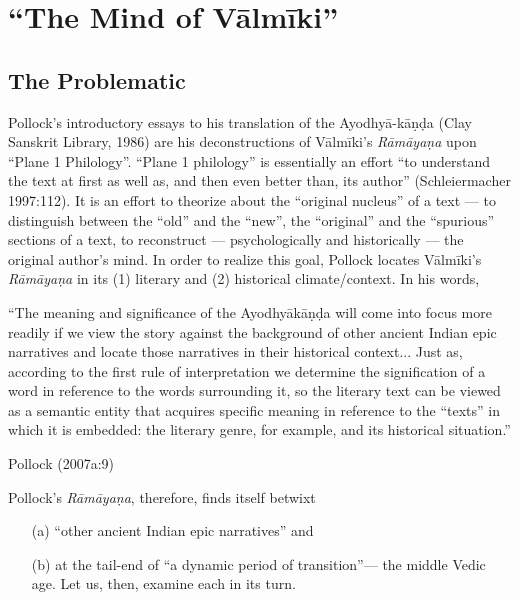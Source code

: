 \chapter{“The Mind of Vālmīki”}\label{chapter1}


\section{The Problematic}\label{sec1.1}

Pollock's introductory essays to his translation of the Ayodhyā-kāṇḍa (Clay Sanskrit Library, 1986) are his deconstructions of Vālmīki’s {\sl Rāmāyaṇa} upon “Plane 1 Philology”. “Plane 1 philology” is essentially an effort “to understand the text at first as well as, and then even better than, its author” (Schleiermacher 1997:112). It is an effort to theorize about the “original nucleus” of a text --- to distinguish between the “old” and the “new”, the “original” and the “spurious” sections of a text, to reconstruct --- psychologically and historically --- the original author's mind. In order to realize this goal, Pollock locates Vālmīki’s {\sl Rāmāyaṇa} in its (1) literary and (2) historical climate/context. In his words,  

\medskip
\begin{myquote}
“The meaning and significance of the Ayodhyākāṇḍa will come into focus more readily if we view the story against the background of other ancient Indian epic narratives and locate those narratives in their historical context... Just as, according to the first rule of  interpretation we determine the signification of a word in reference to the words surrounding it, so the literary text can be viewed as a semantic entity that acquires specific meaning in reference to the “texts” in which it is embedded: the literary genre, for example, and its historical situation.” 		
	       							         				      
\hfill  Pollock (2007a:9)
\end{myquote}

\newpage

Pollock's {\sl Rāmāyaṇa}, therefore, finds itself betwixt 
\begin{itemize}
\itemsep=1pt
\item[(a)] “other ancient Indian epic narratives” and

\item[(b)] at the tail-end of “a dynamic period of transition”--- the middle Vedic age. Let us, then, examine each in its turn. 
\end{itemize}


